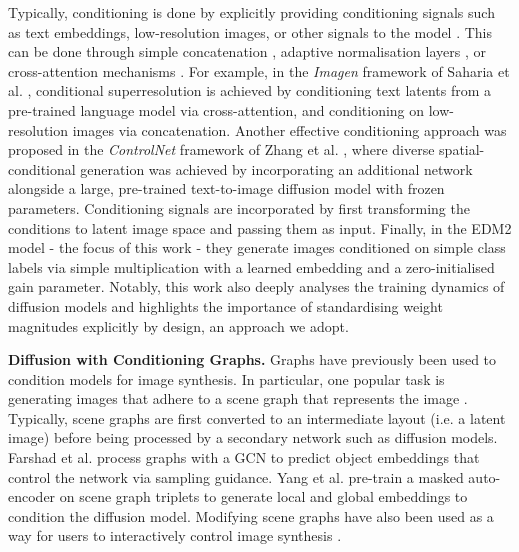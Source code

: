 Typically, conditioning is done by explicitly providing conditioning signals such as text embeddings, low-resolution images, or other signals to the model \cite{saharia_photorealistic_2022, saharia_image_2021, li_controlnet_2024, dhariwal_diffusion_2021}. This can be done through simple concatenation \cite{saharia_image_2021}, adaptive normalisation layers \cite{peebles_scalable_2023}, or cross-attention mechanisms \cite{saharia_photorealistic_2022}. For example, in the \textit{Imagen} framework of Saharia et al. \cite{saharia_photorealistic_2022}, conditional superresolution is achieved by conditioning text latents from a pre-trained language model via cross-attention, and conditioning on low-resolution images via concatenation. Another effective conditioning approach was proposed in the \textit{ControlNet} framework of Zhang et al. \cite{zhang_adding_2023}, where diverse spatial-conditional generation was achieved by incorporating an additional network alongside a large, pre-trained text-to-image diffusion model with frozen parameters. Conditioning signals are incorporated by first transforming the conditions to latent image space and passing them as input. Finally, in the EDM2 model \cite{karras_analyzing_2024} - the focus of this work - they generate images conditioned on simple class labels via simple multiplication with a learned embedding and a zero-initialised gain parameter. Notably, this work also deeply analyses the training dynamics of diffusion models and highlights the importance of standardising weight magnitudes explicitly by design, an approach we adopt.

\textbf{Diffusion with Conditioning Graphs.} Graphs have previously been used to condition models for image synthesis. In particular, one popular task is generating images that adhere to a scene graph that represents the image \cite{johnson_image_2018, yang_diffusion-based_2022, dhamo_semantic_2020, farshad_scenegenie_2023, mittal_interactive_2019}. Typically, scene graphs are first converted to an intermediate layout (i.e. a latent image) before being processed by a secondary network such as diffusion models. Farshad et al. \cite{farshad_scenegenie_2023} process graphs with a GCN to predict object embeddings that control the network via sampling guidance. Yang et al. \cite{yang_diffusion-based_2022} pre-train a masked auto-encoder on scene graph triplets to generate local and global embeddings to condition the diffusion model. Modifying scene graphs have also been used as a way for users to interactively control image synthesis \cite{mittal_interactive_2019, dhamo_semantic_2020}. 

